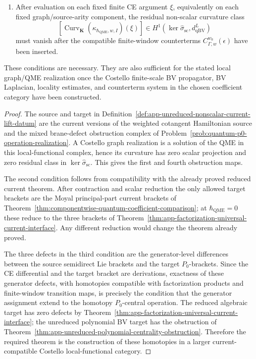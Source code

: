 \begin{prop}
\begin{enumerate}
\[	    \]
    must be \(d_{\mathrm{qBV}}^L\)-exact by homotopies compatible with
    inclusions of intervals, disjoint factorization products, and the
    finite-window regulator maps.
    \item After evaluation on each fixed finite CE argument \(\xi\), equivalently
    on each fixed graph/source-arity component, the residual non-scalar
    curvature class
    \[
      \left[
      \operatorname{Curv}_{\mathbf K}(\kappa_{\hbar_{\mathrm{QME}},w,I})(\xi)
      \right]
      \in
      H^1\!\left(
        \ker\widehat\sigma_{\mathrm{sc}},
        d_{\mathrm{qBV}}^L
      \right)
    \]
    must vanish after the compatible finite-window counterterms
    \(C_{\Gamma,w}^{w_0}(\epsilon)\) have been inserted.
  \end{enumerate}
  These conditions are necessary.  They are also sufficient for the
  stated local graph/QME realization once the Costello finite-scale BV
  propagator, BV Laplacian, locality estimates, and counterterm system in
  the chosen coefficient category have been constructed.
\end{prop}

\begin{proof}
  The source and target in
  Definition~\ref{def:app-unreduced-nonscalar-current-lift-datum} are the
  current versions of the weighted cotangent Hamiltonian source and the
  mixed brane-defect obstruction complex of
  Problem~\ref{prob:quantum-p0-operation-realization}.  A Costello graph
  realization is a solution of the QME in this local-functional complex,
  hence its curvature has zero scalar projection and zero residual class
  in \(\ker\widehat\sigma_{\mathrm{sc}}\).  This gives the first and
  fourth obstruction maps.

  The second condition follows from compatibility with the already proved
  reduced current theorem.  After contraction and scalar reduction the
  only allowed target brackets are the Moyal principal-part current
  brackets of Theorem~\ref{thm:componentwise-quantum-coefficient-comparison}; at
  \(\hbar_{\mathrm{QME}}=0\) these reduce to the three brackets of
  Theorem~\ref{thm:app-factorization-universal-current-interface}.  Any
  different reduction would change the theorem already proved.

  The three defects in the third condition are the generator-level
  differences between the source semidirect Lie brackets and the target
  \(P_0\)-brackets.  Since the CE differential and the target bracket are
  derivations, exactness of these generator defects, with homotopies
  compatible with factorization products and finite-window transition
  maps, is precisely the condition that the generator assignment extend
  to the homotopy \(P_0\)-central operation.  The reduced algebraic
	  target has zero defects by
	  Theorem~\ref{thm:app-factorization-universal-current-interface}; the
	  unreduced polynomial BV target has the obstruction of
	  Theorem~\ref{thm:app-unreduced-polynomial-centrality-obstruction}.  Therefore
	  the required theorem is the construction of these homotopies in a
	  larger current-compatible Costello local-functional category.
\end{proof}

